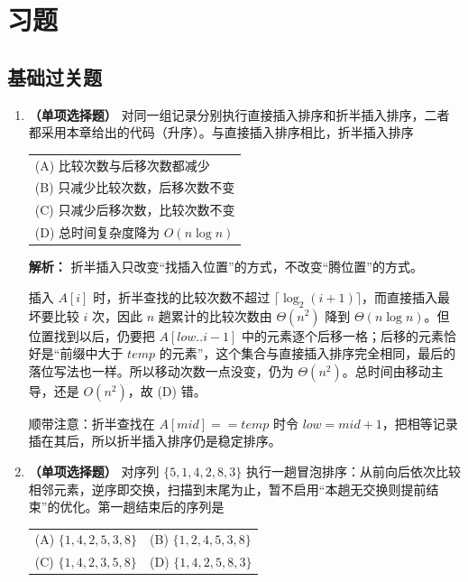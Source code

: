 \section{习题}

\subsection{基础过关题}

\begin{enumerate}

\item \textbf{（单项选择题）} 对同一组记录分别执行直接插入排序和折半插入排序，二者都采用本章给出的代码（升序）。与直接插入排序相比，折半插入排序
\begin{center}
\begin{tabularx}{0.96\linewidth}{@{}X@{}}
(A) 比较次数与后移次数都减少 \\[4pt]
(B) 只减少比较次数，后移次数不变 \\[4pt]
(C) 只减少后移次数，比较次数不变 \\[4pt]
(D) 总时间复杂度降为 $O(n\log n)$
\end{tabularx}
\end{center}

\ifshowsolutions\par\noindent\textbf{解析：} 折半插入只改变“找插入位置”的方式，不改变“腾位置”的方式。

插入 $A[i]$ 时，折半查找的比较次数不超过 $\lceil\log_2(i+1)\rceil$，而直接插入最坏要比较 $i$ 次，因此 $n$ 趟累计的比较次数由 $\Theta(n^2)$ 降到 $\Theta(n\log n)$。但位置找到以后，仍要把 $A[low..i-1]$ 中的元素逐个后移一格；后移的元素恰好是“前缀中大于 $temp$ 的元素”，这个集合与直接插入排序完全相同，最后的落位写法也一样。所以移动次数一点没变，仍为 $\Theta(n^2)$。总时间由移动主导，还是 $O(n^2)$，故 (D) 错。

顺带注意：折半查找在 $A[mid]==temp$ 时令 $low=mid+1$，把相等记录插在其后，所以折半插入排序仍是稳定排序。

\else \answerarea \fi

\item \textbf{（单项选择题）} 对序列 $\{5,1,4,2,8,3\}$ 执行一趟冒泡排序：从前向后依次比较相邻元素，逆序即交换，扫描到末尾为止，暂不启用“本趟无交换则提前结束”的优化。第一趟结束后的序列是
\begin{center}
\begin{tabularx}{0.96\linewidth}{@{}XX@{}}
(A) $\{1,4,2,5,3,8\}$ & (B) $\{1,2,4,5,3,8\}$ \\[4pt]
(C) $\{1,4,2,3,5,8\}$ & (D) $\{1,4,2,5,8,3\}$
\end{tabularx}
\end{center}


\end{enumerate}
